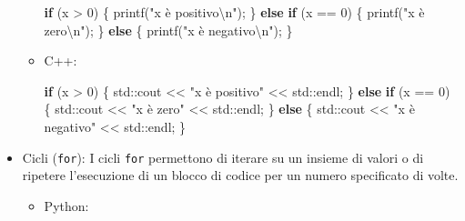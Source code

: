 \documentclass[
  letterpaper,
]{scrbook}
\newenvironment{Shaded}{\begin{snugshade}}{\end{snugshade}}
\newcommand{\BuiltInTok}[1]{\textcolor[rgb]{0.00,0.23,0.31}{#1}}
\newcommand{\ControlFlowTok}[1]{\textcolor[rgb]{0.00,0.23,0.31}{\textbf{#1}}}
\newcommand{\DecValTok}[1]{\textcolor[rgb]{0.68,0.00,0.00}{#1}}
\newcommand{\NormalTok}[1]{\textcolor[rgb]{0.00,0.23,0.31}{#1}}
\newcommand{\OperatorTok}[1]{\textcolor[rgb]{0.37,0.37,0.37}{#1}}
\newcommand{\SpecialCharTok}[1]{\textcolor[rgb]{0.37,0.37,0.37}{#1}}
\newcommand{\StringTok}[1]{\textcolor[rgb]{0.13,0.47,0.30}{#1}}
\begin{document}
\begin{itemize}
\begin{itemize}
\begin{Shaded}
\begin{Highlighting}[]
\ControlFlowTok{if} \OperatorTok{(}\NormalTok{x }\OperatorTok{\textgreater{}} \DecValTok{0}\OperatorTok{)} \OperatorTok{\{}
\NormalTok{  printf}\OperatorTok{(}\StringTok{"x è positivo}\SpecialCharTok{\textbackslash{}n}\StringTok{"}\OperatorTok{);}
\OperatorTok{\}} \ControlFlowTok{else} \ControlFlowTok{if} \OperatorTok{(}\NormalTok{x }\OperatorTok{==} \DecValTok{0}\OperatorTok{)} \OperatorTok{\{}
\NormalTok{  printf}\OperatorTok{(}\StringTok{"x è zero}\SpecialCharTok{\textbackslash{}n}\StringTok{"}\OperatorTok{);}
\OperatorTok{\}} \ControlFlowTok{else} \OperatorTok{\{}
\NormalTok{  printf}\OperatorTok{(}\StringTok{"x è negativo}\SpecialCharTok{\textbackslash{}n}\StringTok{"}\OperatorTok{);}
\OperatorTok{\}}
\end{Highlighting}
\end{Shaded}
  \item
    C++:

\begin{Shaded}
\begin{Highlighting}[]
\ControlFlowTok{if} \OperatorTok{(}\NormalTok{x }\OperatorTok{\textgreater{}} \DecValTok{0}\OperatorTok{)} \OperatorTok{\{}
  \BuiltInTok{std::}\NormalTok{cout }\OperatorTok{\textless{}\textless{}} \StringTok{"x è positivo"} \OperatorTok{\textless{}\textless{}} \BuiltInTok{std::}\NormalTok{endl}\OperatorTok{;}
\OperatorTok{\}} \ControlFlowTok{else} \ControlFlowTok{if} \OperatorTok{(}\NormalTok{x }\OperatorTok{==} \DecValTok{0}\OperatorTok{)} \OperatorTok{\{}
  \BuiltInTok{std::}\NormalTok{cout }\OperatorTok{\textless{}\textless{}} \StringTok{"x è zero"} \OperatorTok{\textless{}\textless{}} \BuiltInTok{std::}\NormalTok{endl}\OperatorTok{;}
\OperatorTok{\}} \ControlFlowTok{else} \OperatorTok{\{}
  \BuiltInTok{std::}\NormalTok{cout }\OperatorTok{\textless{}\textless{}} \StringTok{"x è negativo"} \OperatorTok{\textless{}\textless{}} \BuiltInTok{std::}\NormalTok{endl}\OperatorTok{;}
\OperatorTok{\}}
\end{Highlighting}
\end{Shaded}
  \end{itemize}
\item
  Cicli (\texttt{for}): I cicli \texttt{for} permettono di iterare su un
  insieme di valori o di ripetere l'esecuzione di un blocco di codice
  per un numero specificato di volte.

  \begin{itemize}
  \item
    Python:


\end{itemize}
\end{itemize}
\end{document}

